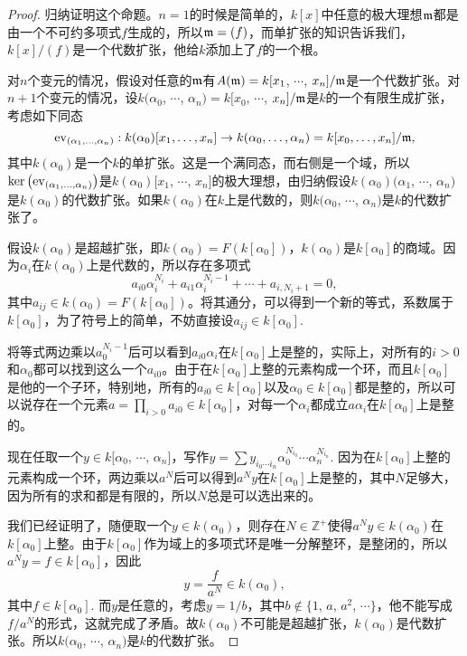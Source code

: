 \begin{proof} 
	归纳证明这个命题。$n=1$的时候是简单的，$k[x]$中任意的极大理想$\mathfrak{m}$都是由一个不可约多项式$f$生成的，所以$\mathfrak{m}=(f)$，而单扩张的知识告诉我们，$k[x]/(f)$是一个代数扩张，他给$k$添加上了$f$的一个根。

	对$n$个变元的情况，假设对任意的$\mathfrak{m}$有$A(\mathfrak{m})=k[x_1$, $\cdots$, $x_n]/\mathfrak{m}$是一个代数扩张。对$n+1$个变元的情况，设$k(\alpha_0$, $\cdots$, $\alpha_{n})=k[x_0$, $\cdots$, $x_n]/\mathfrak{m}$是$k$的一个有限生成扩张，考虑如下同态
	\[
		\operatorname{ev}_{(\alpha_1,\dots,\alpha_n)}:k(\alpha_0)[x_1,\dots,x_{n}]\to k(\alpha_0,\dots,\alpha_{n})=k[x_0,\dots,x_n]/\mathfrak{m},
	\]
	其中$k(\alpha_0)$是一个$k$的单扩张。这是一个满同态，而右侧是一个域，所以$\ker\left(\operatorname{ev}_{(\alpha_1,\dots,\alpha_n)}\right)$是$k(\alpha_0)[x_1$, $\cdots$, $x_{n}]$的极大理想，由归纳假设$k(\alpha_0)(\alpha_1$, $\cdots$, $\alpha_{n})$是$k(\alpha_0)$的代数扩张。如果$k(\alpha_0)$在$k$上是代数的，则$k(\alpha_0$, $\cdots$, $\alpha_{n})$是$k$的代数扩张了。

	假设$k(\alpha_0)$是超越扩张，即$k(\alpha_0)=F(k[\alpha_0])$，$k(\alpha_0)$是$k[\alpha_0]$的商域。因为$\alpha_i$在$k(\alpha_0)$上是代数的，所以存在多项式
	\[
		a_{i0}\alpha_i^{N_i}+a_{i1}\alpha_i^{N_i-1}+\cdots +a_{i,N_i+1}=0,
	\]
	其中$a_{ij}\in k(\alpha_0)=F(k[\alpha_0])$。将其通分，可以得到一个新的等式，系数属于$k[\alpha_0]$，为了符号上的简单，不妨直接设$a_{ij}\in k[\alpha_0]$.

	将等式两边乘以$a_0^{N_i-1}$后可以看到$a_{i0}\alpha_i$在$k[\alpha_0]$上是整的，实际上，对所有的$i>0$和$\alpha_0$都可以找到这么一个$a_{i0}$。由于在$k[\alpha_0]$上整的元素构成一个环，而且$k[\alpha_0]$是他的一个子环，特别地，所有的$a_{i0}\in k[\alpha_0]$以及$\alpha_0\in k[\alpha_0]$都是整的，所以可以说存在一个元素$a=\prod_{i>0}a_{i0}\in k[\alpha_0]$，对每一个$\alpha_i$都成立$a\alpha_i$在$k[\alpha_0]$上是整的。

	现在任取一个$y\in k[\alpha_0$, $\cdots$, $\alpha_n]$，写作$y=\sum y_{i_0 \cdots i_n}\alpha_0^{N_{i_0}}\cdots\alpha_{n}^{N_{i_n}}$.
	因为在$k[\alpha_0]$上整的元素构成一个环，两边乘以$a^N$后可以得到$a^Ny$在$k[\alpha_0]$上是整的，其中$N$足够大，因为所有的求和都是有限的，所以$N$总是可以选出来的。

	我们已经证明了，随便取一个$y\in k(\alpha_0)$，则存在$N\in \mathbb{Z}^+$使得$a^Ny\in k(\alpha_0)$在$k[\alpha_0]$上整。由于$k[\alpha_0]$作为域上的多项式环是唯一分解整环，是整闭的，所以$a^Ny=f\in k[\alpha_0]$，因此
	\[
		y=\frac{f}{a^N}\in k(\alpha_0),
	\]
	其中$f\in k[\alpha_0]$. 而$y$是任意的，考虑$y=1/b$，其中$b\not\in \{1$, $a$, $a^2$, $\cdots\}$，他不能写成$f/a^N$的形式，这就完成了矛盾。故$k(\alpha_0)$不可能是超越扩张，$k(\alpha_0)$是代数扩张。所以$k(\alpha_0$, $\cdots$, $\alpha_{n})$是$k$的代数扩张。\end{proof}

